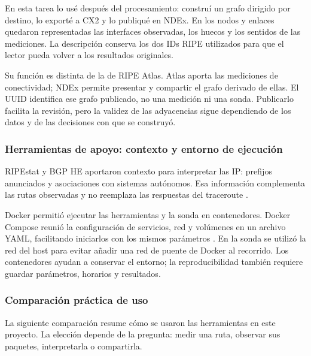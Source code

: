 En esta tarea lo usé después del procesamiento: construí un grafo dirigido por destino, lo exporté a CX2 y lo publiqué en NDEx. En los nodos y enlaces quedaron representadas las interfaces observadas, los huecos y los sentidos de las mediciones. La descripción conserva los dos IDs RIPE utilizados para que el lector pueda volver a los resultados originales.

Su función es distinta de la de RIPE Atlas. Atlas aporta las mediciones de conectividad; NDEx permite presentar y compartir el grafo derivado de ellas. El UUID identifica ese grafo publicado, no una medición ni una sonda. Publicarlo facilita la revisión, pero la validez de las adyacencias sigue dependiendo de los datos y de las decisiones con que se construyó.

\subsubsection{Herramientas de apoyo: contexto y entorno de ejecución}

RIPEstat y BGP HE aportaron contexto para interpretar las IP: prefijos anunciados y asociaciones con sistemas autónomos. Esa información complementa las rutas observadas y no reemplaza las respuestas del traceroute \cite{ref4,ref7}.

Docker permitió ejecutar las herramientas y la sonda en contenedores. Docker Compose reunió la configuración de servicios, red y volúmenes en un archivo YAML, facilitando iniciarlos con los mismos parámetros \cite{plat_compose}. En la sonda se utilizó la red del host para evitar añadir una red de puente de Docker al recorrido. Los contenedores ayudan a conservar el entorno; la reproducibilidad también requiere guardar parámetros, horarios y resultados.

\subsubsection{Comparación práctica de uso}

La siguiente comparación resume cómo se usaron las herramientas en este proyecto. La elección depende de la pregunta: medir una ruta, observar sus paquetes, interpretarla o compartirla.

